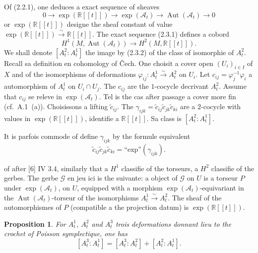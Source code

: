 \documentclass[11pt,a4paper]{article}
\theoremstyle{plain}
\newtheorem{proposition}[theorem]{Proposition}
\theoremstyle{definition}
\DeclareMathOperator{\Aut}{Aut}
\newcommand{\R}{\mathbb{R}}
\newcommand{\iso}{\xrightarrow{\sim}}
\begin{document}
\subsection{}
Of (2.2.1), one deduces a exact sequence of sheaves
\begin{equation}
0 \longrightarrow \exp(\R[[t]]) \longrightarrow \exp(\mathcal{A}_{t}) \longrightarrow \Aut(\mathcal{A}_{t}) \longrightarrow 0 \tag{2.3.1}
\end{equation}
or $\exp(\R[[t]])$ designe the sheaf constant of value $\exp(\R[[t]]) \iso \R[[t]]$. The exact sequence (2.3.1) defines a cobord
\begin{equation}
H^{1}(M, \Aut(\mathcal{A}_{t})) \longrightarrow H^{2}(M, \R[[t]]). \tag{2.3.2}
\end{equation}
We shall denote $[A_{t}^{2} : A_{t}^{1}]$ the image by (2.3.2) of the class of isomorphie of $A_{t}^{2}$. Recall sa definition en cohomology of \v{C}ech. One choisit a cover open $(U_{i})_{i \in I}$ of $X$ and of the isomorphisms of deformations $\varphi_{ij}: A_{t}^{1} \iso A_{t}^{2}$ on $U_{i}$. Let $c_{ij} = \varphi_{j}^{-1} \varphi_{i}$ a automorphism of $A_{t}^{1}$ on $U_{i} \cap U_{j}$. The $c_{ij}$ are the $1$-cocycle decrivant $A_{t}^{2}$. Assume that $c_{ij}$ se releve in $\exp(\mathcal{A}_{t})$. Tel is the cas after passage a cover more fin (cf.~A.1~(a)). Choisissons a lifting $\tilde{c}_{ij}$. The $\gamma_{ijk} = \tilde{c}_{ij} \tilde{c}_{jk} \tilde{c}_{ki}$ are a $2$-cocycle with values in $\exp(\R[[t]])$, identifie a $\R[[t]]$. Sa class is $[A_{t}^{2} : A_{t}^{1}]$.

It is parfois commode of define $\gamma_{ijk}$ by the formule equivalent
\[
\tilde{c}_{ij} \tilde{c}_{jk} \tilde{c}_{ki} = \text{``exp''} (\gamma_{ijk}).
\]

of after [6] IV 3.4, similarly that a $H^{1}$ classifie of the torseurs, a $H^{2}$ classifie of the gerbes. The gerbe $\mathcal{G}$ en jeu ici is the suivante: a object of $\mathcal{G}$ on $U$ is a torseur $P$ under $\exp(\mathcal{A}_{t})$, on $U$, equipped with a morphism $\exp(\mathcal{A}_{t})$-equivariant in the $\Aut(\mathcal{A}_{t})$-torseur of the isomorphisms $A_{t}^{1} \iso A_{t}^{2}$. The sheaf of the automorphismes of $P$ (compatible a the projection datum) is $\exp(\R[[t]])$.

\begin{proposition}
For $A_{t}^{1}$, $A_{t}^{2}$ and $A_{t}^{3}$ trois deformations donnant lieu to the crochet of Poisson symplectique, one has
\[
[A_{t}^{3} : A_{t}^{1}] = [A_{t}^{3} : A_{t}^{2}] + [A_{t}^{2} : A_{t}^{1}].
\]
\end{proposition}
\end{document}

